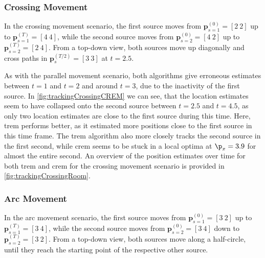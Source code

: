 

\FloatBarrier


\subsubsection*{Crossing Movement}
In the crossing movement scenario, the first source moves from $\bm p^{(0)}_{s=1}=[2~2]$ up to $\bm p^{(T)}_{s=1}=[4~4]$, while the second source moves from $\bm p^{(0)}_{s=2}=[4~2]$ up to $\bm p^{(T)}_{s=2}=[2~4]$. From a top-down view, both sources move up diagonally and cross paths in $\bm p_s^{(T/2)}=[3~3]$ at $t=2.5$.




As with the parallel movement scenario, both algorithms give erroneous estimates between $t=1$ and $t=2$ and around $t=3$, due to the inactivity of the first source. In \autoref{fig:trackingCrossingCREM} we can see, that the location estimates seem to have collapsed onto the second source between $t=2.5$ and $t=4.5$, as only two location estimates are close to the first source during this time. Here, \gls{trem} performs better, as it estimated more positions close to the first source in this time frame. The \gls{trem} algorithm also more closely tracks the second source in the first second, while \gls{crem} seems to be stuck in a local optima at $\p_x=3.9$ for almost the entire second. An overview of the position estimates over time for both \gls{trem} and \gls{crem} for the crossing movement scenario is provided in \autoref{fig:trackingCrossingRoom}.


\FloatBarrier

\subsubsection*{Arc Movement}
In the arc movement scenario, the first source moves from $\bm p^{(0)}_{s=1}=[3~2]$ up to $\bm p^{(T)}_{s=1}=[3~4]$, while the second source moves from $\bm p^{(0)}_{s=2}=[3~4]$ down to $\bm p^{(T)}_{s=2}=[3~2]$. From a top-down view, both sources move along a half-circle, until they reach the starting point of the respective other source.




